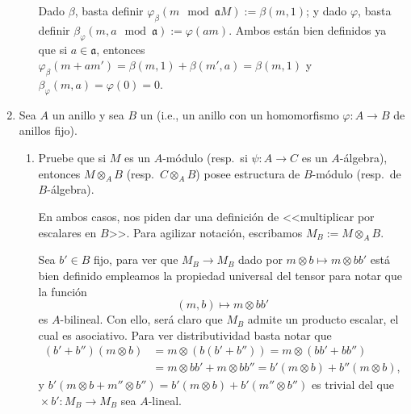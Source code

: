 \documentclass[11pt, reqno]{amsart}
\begin{document}
\begin{enumerate}
\begin{enumerate}
\begin{sol}
					Dado $\beta$, basta definir $\varphi_\beta(m \mod{\mathfrak{a}M}) := \beta(m, 1)$;
					y dado $\varphi$, basta definir $\beta_\varphi(m, a \mod{\mathfrak{a}}) := \varphi(am)$.
					Ambos están bien definidos ya que si $a \in \mathfrak{a}$, entonces
					$\varphi_\beta(m + am') = \beta(m, 1) + \beta(m', a) = \beta(m, 1)$
					y $\beta_\varphi(m, a) = \varphi(0) = 0$.
				\end{sol}
		\end{enumerate}

	\item Sea $A$ un anillo y sea $B$ un  (i.e., un anillo con un homomorfismo $\varphi\colon A \to B$ de anillos fijo).
		\begin{enumerate}
			\item Pruebe que si $M$ es un $A$-módulo (resp.\ si $\psi \colon A \to C$ es un $A$-álgebra),
				entonces $M \otimes_A B$ (resp.\ $C\otimes_A B$) posee estructura de $B$-módulo (resp.\
				de $B$-álgebra).

				\begin{sol}
					En ambos casos, nos piden dar una definición de <<multiplicar por escalares en
					$B$>>.
					Para agilizar notación, escribamos $M_B := M \otimes_A B$.

					Sea $b' \in B$ fijo, para ver que $M_B \to M_B$ dado por $m\otimes b \mapsto
					m\otimes bb'$ está bien definido empleamos la propiedad universal del tensor
					para notar que la función
					\[
						(m, b) \longmapsto m \otimes bb'
					\]
					es $A$-bilineal.
					Con ello, será claro que $M_B$ admite un producto escalar, el cual es
					asociativo.
					Para ver distributividad basta notar que
					\begin{align*}
						(b' + b'')(m\otimes b) &= m\otimes (b(b' + b'')) = m\otimes (bb' + bb'') \\
								       &= m\otimes bb' + m\otimes bb'' = b'(m\otimes b) + b''(m\otimes b),
					\end{align*}
					y $b'(m\otimes b + m''\otimes b'') = b'(m\otimes b) + b'(m''\otimes b'')$ es
					trivial del que ${}\times b' \colon M_B \to M_B$ sea $A$-lineal.
				\end{sol}


\end{enumerate}
\end{enumerate}
\end{document}
